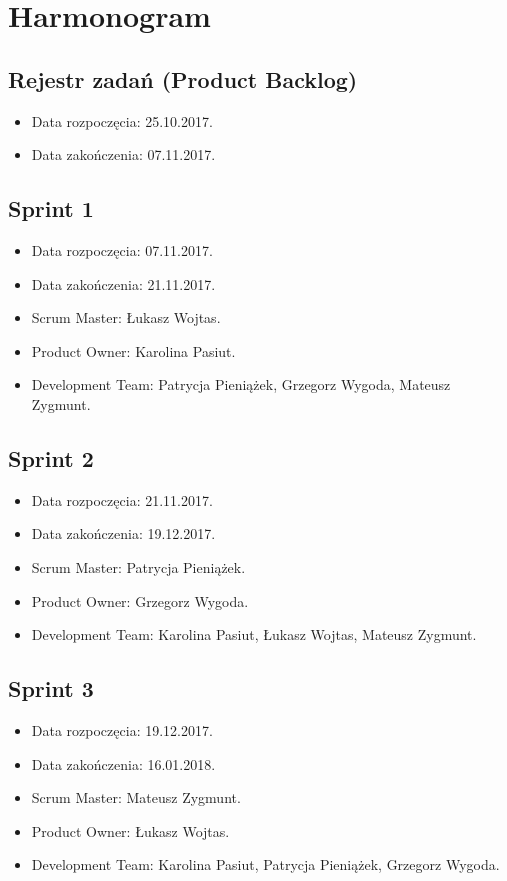 \documentclass[a4paper]{article}
\begin{document}
\section{Harmonogram}

\subsection{Rejestr zadań (Product Backlog)}

\begin{itemize}
\item Data rozpoczęcia: 25.10.2017.
\item  Data zakończenia: 07.11.2017.
\end{itemize}

\subsection{Sprint 1}

\begin{itemize}
\item Data rozpoczęcia: 07.11.2017.
\item Data zakończenia: 21.11.2017.
\item Scrum Master: Łukasz Wojtas.
\item Product Owner: Karolina Pasiut.
\item Development Team: Patrycja Pieniążek, Grzegorz Wygoda, Mateusz Zygmunt.
\end{itemize}

\subsection{Sprint 2}

\begin{itemize}
\item Data rozpoczęcia: 21.11.2017.
\item  Data zakończenia: 19.12.2017.
\item Scrum Master: Patrycja Pieniążek.
\item Product Owner: Grzegorz Wygoda.
\item Development Team: Karolina Pasiut, Łukasz Wojtas, Mateusz Zygmunt.
\end{itemize}

\subsection{Sprint 3}

\begin{itemize}
\item Data rozpoczęcia: 19.12.2017.
\item  Data zakończenia: 16.01.2018.
\item Scrum Master: Mateusz Zygmunt.
\item Product Owner: Łukasz Wojtas.
\item Development Team: Karolina Pasiut, Patrycja Pieniążek, Grzegorz Wygoda.
\end{itemize}
\end{document}

